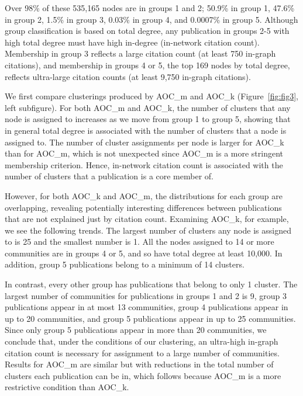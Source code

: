 \documentclass[12pt, oneside]{article}   	%
\begin{document}
{Over 98\% of these 535,165 nodes are in groups 1 and 2; 50.9\% in group 1, 47.6\% in group  2, 1.5\% in group 3,  0.03\% in group 4, and 0.0007\% in group 5. 
Although group classification is based on total degree,  any publication in groups 2-5 with high total degree must have high in-degree (in-network citation count). Membership in group 3  reflects a large citation count (at least 750 in-graph citations), and membership in groups 4 or 5, the top 169 nodes by total degree, reflects ultra-large citation counts (at least 9,750 in-graph citations).    
	
We first compare clusterings produced by AOC\_m and AOC\_k (Figure~\ref{fig:fig3}, left subfigure). For both AOC\_m and AOC\_k, the number of clusters that any node is assigned to increases as we move from group 1 to group 5, showing that in general total degree is associated with the number of clusters that a node is assigned to. The number of cluster assignments per node is larger for AOC\_k than for AOC\_m, which is not unexpected since AOC\_m is a more stringent membership criterion. Hence, in-network citation count is associated with the number of clusters that a publication is a core member of.
	
However, for both AOC\_k and AOC\_m, the distributions for each group are overlapping, revealing potentially interesting differences between publications that are not explained just by citation count. 
Examining AOC\_k, for example, we see the following trends. The largest number of clusters any node is assigned to is 25 and the smallest number is 1. All the nodes assigned to 14 or more communities are in groups 4 or 5, and so have total degree at least 10,000. In addition, group 5 publications belong to a minimum of 14 clusters. 

In contrast, every other group has publications that belong to only 1 cluster. The largest number of communities for publications in groups 1 and 2 is  9,  group 3 publications appear in at most 13 communities, group 4 publications appear in up to 20 communities, and group 5 publications appear in up to 25 communities.  Since only group 5 publications appear in more than 20 communities, we conclude that, under the conditions of our clustering, an ultra-high in-graph citation count is  necessary  for assignment to a large number of communities.  Results for AOC\_m are similar but with reductions in the total number of clusters each publication can be in,  which follows because AOC\_m is a more restrictive condition than AOC\_k.  

}
\end{document}
